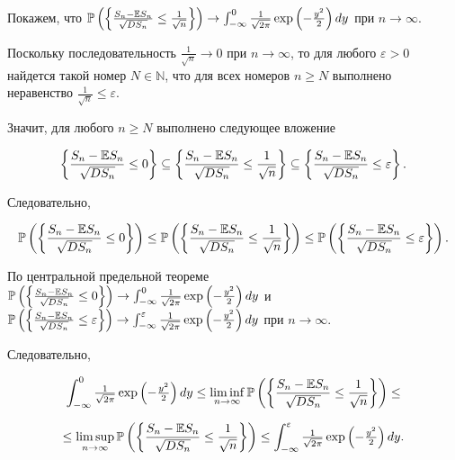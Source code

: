 Покажем, что ${\rm {\mathbb P}}\left(\left\{\frac{S_{n} -{\rm {\mathbb E}}S_{n} }{\sqrt{DS_{n} } } \le \frac{1}{\sqrt{n} } \right\}\right)\to \int _{-\infty }^{0}{\tfrac{1}{\sqrt{2\pi } }} \exp \left(-{\tfrac{y^{2} }{2}} \right)dy $ при $n\to \infty $.

Поскольку последовательность $\frac{1}{\sqrt{n} } \to 0$ при $n\to \infty $, то для любого $\varepsilon >0$ найдется такой номер $N\in {\mathbb N}$, что для всех номеров $n\ge N$ выполнено неравенство $\frac{1}{\sqrt{n} } \le \varepsilon $.

Значит, для любого $n\ge N$ выполнено следующее вложение

\[\left\{\frac{S_{n} -{\rm {\mathbb E}}S_{n} }{\sqrt{DS_{n} } } \le 0\right\}\subseteq \left\{\frac{S_{n} -{\rm {\mathbb E}}S_{n} }{\sqrt{DS_{n} } } \le \frac{1}{\sqrt{n} } \right\}\subseteq \left\{\frac{S_{n} -{\rm {\mathbb E}}S_{n} }{\sqrt{DS_{n} } } \le \varepsilon \right\}.\] 

Следовательно,

\[{\rm {\mathbb P}}\left(\left\{\frac{S_{n} -{\rm {\mathbb E}}S_{n} }{\sqrt{DS_{n} } } \le 0\right\}\right)\le {\rm {\mathbb P}}\left(\left\{\frac{S_{n} -{\rm {\mathbb E}}S_{n} }{\sqrt{DS_{n} } } \le \frac{1}{\sqrt{n} } \right\}\right)\le {\rm {\mathbb P}}\left(\left\{\frac{S_{n} -{\rm {\mathbb E}}S_{n} }{\sqrt{DS_{n} } } \le \varepsilon \right\}\right).\] 

По центральной предельной теореме ${\rm {\mathbb P}}\left(\left\{\frac{S_{n} -{\rm {\mathbb E}}S_{n} }{\sqrt{DS_{n} } } \le 0\right\}\right)\to \int _{-\infty }^{0}{\tfrac{1}{\sqrt{2\pi } }} \exp \left(-{\tfrac{y^{2} }{2}} \right)dy $ и ${\rm {\mathbb P}}\left(\left\{\frac{S_{n} -{\rm {\mathbb E}}S_{n} }{\sqrt{DS_{n} } } \le \varepsilon \right\}\right)\to \int _{-\infty }^{\varepsilon }{\tfrac{1}{\sqrt{2\pi } }} \exp \left(-{\tfrac{y^{2} }{2}} \right)dy $ при $n\to \infty $.

Следовательно,

\[\int _{-\infty }^{0}{\tfrac{1}{\sqrt{2\pi } }} \exp \left(-{\tfrac{y^{2} }{2}} \right)dy \le \mathop{\lim \inf }\limits_{n\to \infty } {\rm {\mathbb P}}\left(\left\{\frac{S_{n} -{\rm {\mathbb E}}S_{n} }{\sqrt{DS_{n} } } \le \frac{1}{\sqrt{n} } \right\}\right)\le \] 

\[\le \mathop{\lim \sup }\limits_{n\to \infty } {\rm {\mathbb P}}\left(\left\{\frac{S_{n} -{\rm {\mathbb E}}S_{n} }{\sqrt{DS_{n} } } \le \frac{1}{\sqrt{n} } \right\}\right)\le \int _{-\infty }^{\varepsilon }{\tfrac{1}{\sqrt{2\pi } }} \exp \left(-{\tfrac{y^{2} }{2}} \right)dy .\] 

